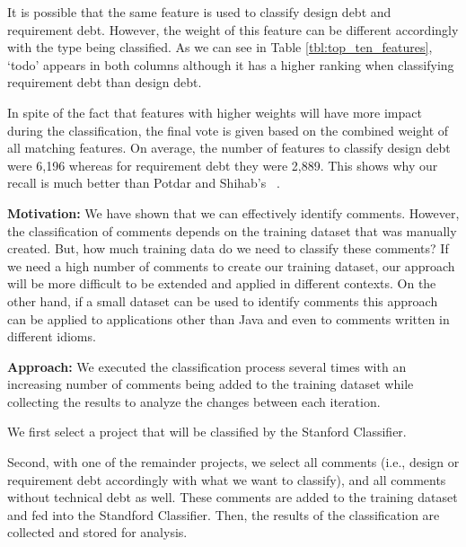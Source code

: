 It is possible that the same feature is used to classify design debt and requirement debt. However, the weight of this feature can be different accordingly with the type being classified. As we can see in Table \ref{tbl:top_ten_features}, `todo' appears in both columns although it has a higher ranking when classifying requirement debt than design debt. 

In spite of the fact that features with higher weights will have more impact during the classification, the final vote is given based on the combined weight of all matching features. On average, the number of features to classify design debt were 6,196 whereas for requirement debt they were 2,889. This shows why our recall is much better than Potdar and Shihab's ~\cite{Potdar2014ICSME}. 


\vspace{3mm}
\noindent\rqiii
\vspace{3mm}

\noindent \textbf{Motivation:} We have shown that we can effectively identify \SATD comments. However, the classification of \SATD comments depends on the training dataset that was manually created. But, how much training data do we need to classify these comments? If we need a high number of comments to create our training dataset, our approach will be more difficult to be extended and applied in different contexts. On the other hand, if a small dataset can be used to identify \SATD comments this approach can be applied to applications other than Java and even to comments written in different idioms. 

\vspace{1mm}
\noindent \textbf{Approach:} We executed the classification process several times with an increasing number of comments being added to the training dataset while collecting the results to analyze the changes between each iteration.

We first select a project that will be classified by the Stanford Classifier.

Second, with one of the remainder projects, we select all \SATD comments (i.e., design or requirement debt accordingly with what we want to classify), and all comments without technical debt as well. These comments are added to the training dataset and fed into the Standford Classifier. Then, the results of the classification are collected and stored for analysis.

